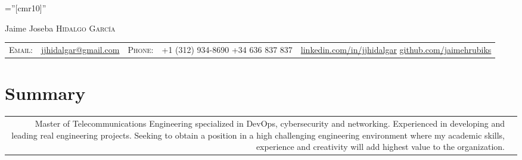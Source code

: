 \documentclass[a4paper,10pt]{article}
\begin{document}

\pagestyle{empty} %

\font\fb=''[cmr10]'' %

\par{\centering
		{\Huge Jaime Joseba \textsc{Hidalgo García}
	}\bigskip\par}



\begin{tabular}{p{1.0cm}p{4.0cm}rp{4.0cm}p{1.5cm}}
    \textsc{Email:} & \href{mailto:jjhidalgar@gmail.com}{jjhidalgar@gmail.com} & 
    \textsc{Phone:\newline} & +1 (312) 934-8690 \newline +34 636 837 837  &
    \href{https://www.linkedin.com/in/jjhidalgar/}{linkedin.com/in/jjhidalgar} \newline \href{https://github.com/jaimehrubiks}{github.com/jaimehrubiks}
\end{tabular}

\section{Summary}
\begin{tabular}{rp{13.6cm}}
  \begin{minipage}[t]{1\columnwidth}%
  Master of Telecommunications Engineering specialized in DevOps, cybersecurity and networking. Experienced in developing and leading real engineering projects. Seeking to obtain a position in a high challenging engineering environment where my academic skills, experience and creativity will add highest value to the organization.    \end{minipage}\tabularnewline
\end{tabular}
\end{document}
